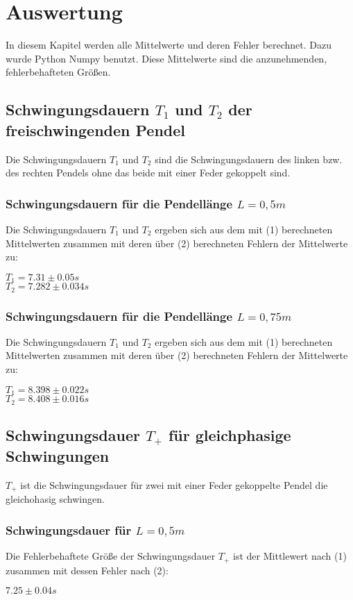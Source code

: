 \section{Auswertung}
\label{sec:Auswertung}
In diesem Kapitel werden alle Mittelwerte und deren Fehler berechnet. 
Dazu wurde Python Numpy benutzt. Diese Mittelwerte sind die anzunehmenden, fehlerbehafteten Größen.
\subsection{Schwingungsdauern $T_1$ und $T_2$ der  freischwingenden Pendel}
Die Schwingungsdauern $T_1$ und $T_2$ sind die Schwingungsdauern des linken bzw. des rechten Pendels ohne das
beide mit einer Feder gekoppelt sind.

\subsubsection{Schwingungsdauern für die Pendellänge $L=0,5m$}
Die Schwingungsdauern $T_1$ und $T_2$ ergeben sich aus dem mit (1) berechneten Mittelwerten
zusammen mit deren über (2) berechneten Fehlern der Mittelwerte zu:
\begin{center}
  $T_1=7.31\pm0.05s$\\
  $T_2=7.282\pm0.034s$
\end{center}


\subsubsection{Schwingungsdauern für die Pendellänge $L=0,75m$}
Die Schwingungsdauern $T_1$ und $T_2$ ergeben sich aus dem mit (1) berechneten Mittelwerten
zusammen mit deren über (2) berechneten Fehlern der Mittelwerte zu:
\begin{center}
  $T_1=8.398\pm0.022s$\\
  $T_2=8.408\pm0.016s$
\end{center}


\subsection{Schwingungsdauer $T_+$  für gleichphasige Schwingungen}
$T_+$ ist die Schwingungsdauer für zwei mit einer Feder gekoppelte Pendel die gleichohasig schwingen.
\subsubsection{Schwingungsdauer für $L=0,5m$}
Die Fehlerbehaftete Größe der Schwingungsdauer $T_+$ ist der Mittlewert nach (1) zusammen 
mit dessen Fehler nach (2):
\begin{center}
  $7.25\pm0.04s$
\end{center}
